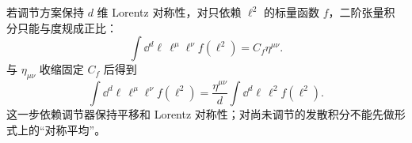 若调节方案保持 $d$ 维 Lorentz 对称性，对只依赖 $\ell^2$ 的标量函数 $f$，二阶张量积分只能与度规成正比：
\begin{equation}
\int\dd^d \ell\,\ell^\mu\ell^\nu f(\ell^2)
=C_f\eta^{\mu\nu}.
\label{eq:rank2-isotropic-ansatz-dp68}
\end{equation}
与 $\eta_{\mu\nu}$ 收缩固定 $C_f$ 后得到
\begin{equation}
 {
 \int\dd^d \ell\,\ell^\mu\ell^\nu f(\ell^2)
 =\frac{\eta^{\mu\nu}}d
 \int\dd^d \ell\,\ell^2 f(\ell^2).}
 \label{eq:tensor-reduction-proof-r9}
\end{equation}
这一步依赖调节器保持平移和 Lorentz 对称性；对尚未调节的发散积分不能先做形式上的“对称平均”。
